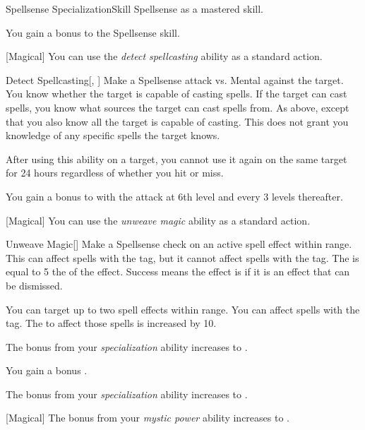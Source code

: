     \begin{feat}{Spellsense Specialization}{Skill}
        \featpre Spellsense as a mastered skill.

         You gain a  bonus to the Spellsense skill.

        [Magical] You can use the \textit{detect spellcasting} ability as a standard action.
        \begin{freeability}{Detect Spellcasting}[, ]
            Make a Spellsense attack vs. Mental against the target.
            \hit You know whether the target is capable of casting spells.
            If the target can cast spells, you know what sources the target can cast spells from.
            \crit As above, except that you also know all  the target is capable of casting.
            This does not grant you knowledge of any specific spells the target knows.

            After using this ability on a target, you cannot use it again on the same target for 24 hours regardless of whether you hit or miss.

            \rankline
            You gain a  bonus to  with the attack at 6th level and every 3 levels thereafter.
        \end{freeability}

        [Magical] You can use the \textit{unweave magic} ability as a standard action.
        \begin{freeability}{Unweave Magic}[]
            Make a Spellsense check on an active spell effect within \rngmed range.
            This can affect spells with the  tag, but it cannot affect spells with the  tag.
            The  is equal to 5 \add the  of the effect.
            Success means the effect is  if it is an effect that can be dismissed.

            \rankline
             You can target up to two spell effects within range.
             You can affect spells with the  tag.
            The  to affect those spells is increased by 10.
        \end{freeability}

         The bonus from your \textit{specialization} ability increases to .

         You gain a  bonus  .

         The bonus from your \textit{specialization} ability increases to .

        [Magical] The bonus from your \textit{mystic power} ability increases to .
    \end{feat}

